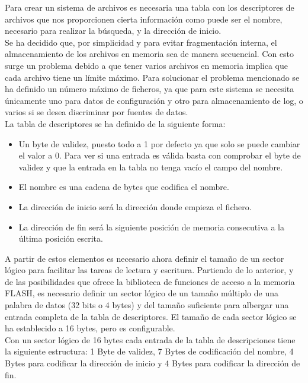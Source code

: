 Para crear un sistema de archivos es necesaria una tabla con los descriptores de archivos que nos proporcionen cierta información como puede ser el nombre, necesario para realizar la búsqueda, y la dirección de inicio.\\

Se ha decidido que, por simplicidad y para evitar fragmentación interna, el almacenamiento de los archivos en memoria sea de manera secuencial. Con esto surge un problema debido a que tener varios archivos en memoria implica que cada archivo tiene un límite máximo. Para solucionar el problema mencionado se ha definido un número máximo de ficheros, ya que para este sistema se necesita únicamente uno para datos de configuración y otro para almacenamiento de log, o varios si se desea discriminar por fuentes de datos.\\

La tabla de descriptores se ha definido de la siguiente forma:

\begin{itemize}
\item Un byte de validez, puesto todo a 1 por defecto ya que solo se puede cambiar el valor a 0. Para ver si una entrada es válida basta con comprobar el byte de validez y que la entrada en la tabla no tenga vacío el campo del nombre.
\item El nombre es una cadena de bytes que codifica el nombre.
\item La dirección de inicio será la dirección donde empieza el fichero.
\item La dirección de fin será la siguiente posición de memoria consecutiva a la última posición escrita. \\
\end{itemize}

A partir de estos elementos es necesario ahora definir el tamaño de un sector lógico para facilitar las tareas de lectura y escritura. Partiendo de lo anterior, y de las posibilidades que ofrece la biblioteca de funciones de acceso a la memoria FLASH, es necesario definir un sector lógico de un tamaño múltiplo de una palabra de datos (32 bits o 4 bytes) y del tamaño suficiente para albergar una entrada completa de la tabla de descriptores. El tamaño de cada sector lógico se ha establecido a 16 bytes, pero es configurable.\\

Con un sector lógico de 16 bytes cada entrada de la tabla de descripciones tiene la siguiente estructura: 1 Byte de validez, 7 Bytes de codificación del nombre, 4 Bytes para codificar la dirección de inicio y 4 Bytes para codificar la dirección de fin.\\

